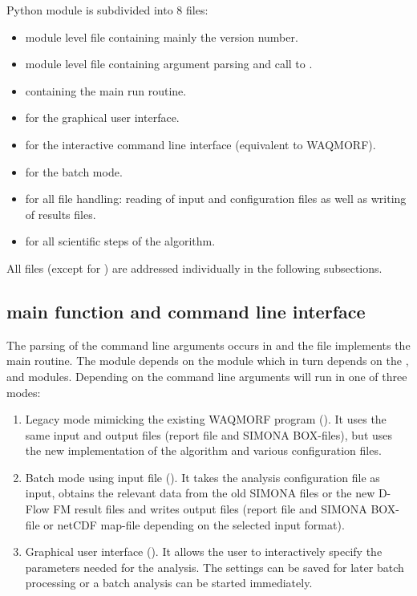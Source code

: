 \dfastmi Python module is subdivided into 8 files:

\begin{itemize}
\item {} module level file containing mainly the version number.
\item {} module level file containing argument parsing and call to .
\item {} containing the main run routine.
\item {} for the graphical user interface.
\item {} for the interactive command line interface (equivalent to WAQMORF).
\item {} for the batch mode.
\item {} for all file handling: reading of input and configuration files as well as writing of results files.
\item {} for all scientific steps of the algorithm.
\end{itemize}

All files (except for ) are addressed individually in the following subsections.

\subsection{main function  and command line interface }

The parsing of the command line arguments occurs in  and the file  implements the main routine.
The  module depends on the  module which in turn depends on the ,  and  modules.
Depending on the command line arguments \dfastmi will run in one of three modes:

\begin{enumerate}
\item Legacy mode mimicking the existing WAQMORF program ().
It uses the same input and output files (report file and SIMONA BOX-files), but uses the new implementation of the algorithm and various configuration files.
\item Batch mode using input file ().
It takes the analysis configuration file as input, obtains the relevant data from the old SIMONA files or the new D-Flow FM result files and writes output files (report file and SIMONA BOX-file or netCDF map-file depending on the selected input format).
\item Graphical user interface ().
It allows the user to interactively specify the parameters needed for the analysis. The settings can be saved for later batch processing or a batch analysis can be started immediately.
\end{enumerate}

